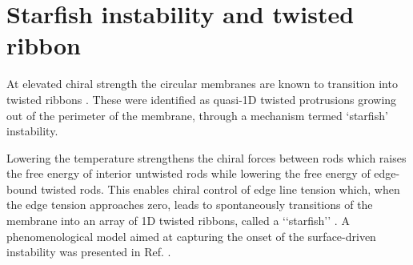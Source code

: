 \section{Starfish instability and twisted ribbon}

At elevated chiral strength the circular membranes are known to transition into twisted ribbons \cite{Gibaud2014}. These were identified as quasi-1D twisted protrusions growing out of the perimeter of the membrane, through a mechanism termed `starfish' instability. 


Lowering the temperature strengthens the chiral forces between  rods which raises the free energy of interior untwisted rods while lowering the free energy of edge-bound twisted rods. This enables chiral control of edge line tension which, when the edge tension approaches zero,  leads to spontaneously transitions of the membrane into an array of 1D twisted ribbons, called a ‘‘starfish’’ \cite{Gibaud2014}. A phenomenological model aimed at capturing the onset of the surface-driven instability was presented in Ref. \cite{kang_sm2016}.




